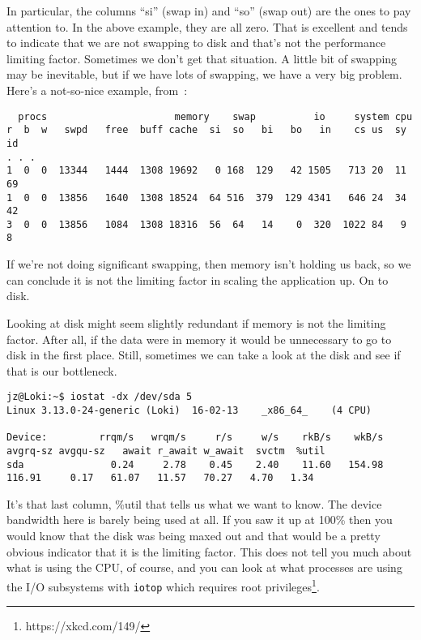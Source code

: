 In particular, the columns ``si'' (swap in) and ``so'' (swap out) are the ones to pay attention to. In the above example, they are all zero. That is excellent and tends to indicate that we are not swapping to disk and that's not the performance limiting factor. Sometimes we don't get that situation. A little bit of swapping may be inevitable, but if we have lots of swapping, we have a very big problem. Here's a not-so-nice example, from~\cite{vmstat}:

\begin{verbatim}
  procs                      memory    swap          io     system cpu
r  b  w   swpd   free  buff cache  si  so   bi   bo   in    cs us  sy  id
. . .
1  0  0  13344   1444  1308 19692   0 168  129   42 1505   713 20  11  69
1  0  0  13856   1640  1308 18524  64 516  379  129 4341   646 24  34  42
3  0  0  13856   1084  1308 18316  56  64   14    0  320  1022 84   9   8
\end{verbatim}

If we're not doing significant swapping, then memory isn't holding us back, so we can conclude it is not the limiting factor in scaling the application up. On to disk.

Looking at disk might seem slightly redundant if memory is not the limiting factor. After all, if the data were in memory it would be unnecessary to go to disk in the first place. Still, sometimes we can take a look at the disk and see if that is our bottleneck.

{\scriptsize
\begin{verbatim}
jz@Loki:~$ iostat -dx /dev/sda 5 
Linux 3.13.0-24-generic (Loki) 	16-02-13 	_x86_64_	(4 CPU)

Device:         rrqm/s   wrqm/s     r/s     w/s    rkB/s    wkB/s avgrq-sz avgqu-sz   await r_await w_await  svctm  %util
sda               0.24     2.78    0.45    2.40    11.60   154.98   116.91     0.17   61.07   11.57   70.27   4.70   1.34
\end{verbatim}
}

It's that last column, \%util that tells us what we want to know. The device bandwidth here is barely being used at all. If you saw it up at 100\% then you would know that the disk was being maxed out and that would be a pretty obvious indicator that it is the limiting factor. This does not tell you much about what is using the CPU, of course, and you can look at what processes are using the I/O subsystems with \texttt{iotop} which requires root privileges\footnote{https://xkcd.com/149/}.

